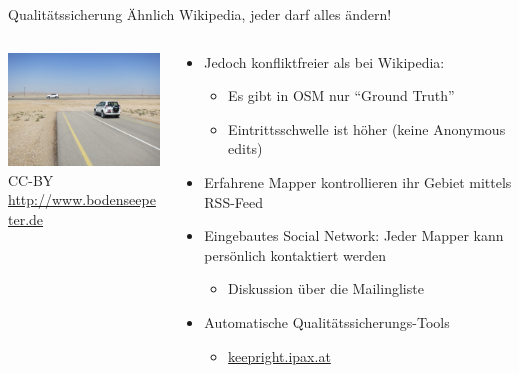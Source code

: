 \documentclass{beamer}
\begin{document}
\begin{frame}{Qualitätssicherung}
Ähnlich Wikipedia, jeder darf alles ändern!
  \begin{columns}[c]
    \begin{column}[T]{.35\textwidth}
      \vspace{1cm}
      \includegraphics[width=4.5cm]{unconnected.jpg} \\
      {\TINY CC-BY \url{http://www.bodenseepeter.de}}
    \end{column}
    \pause
    \begin{column}[T]{.7\textwidth}
      \begin{itemize}
        \item Jedoch konfliktfreier als bei Wikipedia:
        \begin{itemize}
          \item Es gibt in OSM nur "`Ground Truth"'
          \item Eintrittsschwelle ist höher (keine Anonymous edits)
        \end{itemize}
        \item Erfahrene Mapper kontrollieren ihr Gebiet mittels RSS-Feed
        \pause
        \item Eingebautes Social Network: Jeder Mapper kann persönlich kontaktiert werden
        \begin{itemize}
          \item Diskussion über die Mailingliste
        \end{itemize}
        \pause
        \item Automatische Qualitätssicherungs-Tools
        \begin{itemize}
          \item \href{http://keepright.ipax.at/report\_map.php?zoom=14&lat=48.20808&lon=16.37221}{keepright.ipax.at}
        \end{itemize}
      \end{itemize}

    \end{column}
  \end{columns}

\end{frame}
\end{document}
